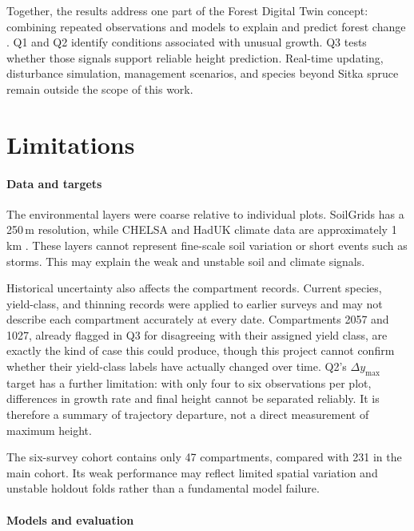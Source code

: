 \documentclass[logo,msc,ai]{infthesis}           %
\begin{document}
Together, the results address one part of the Forest Digital Twin concept: combining repeated observations and models to explain and predict forest change \cite{baskent2026Review_C1_SS,buonocore2022Proposal_C1_SS}. Q1 and Q2 identify conditions associated with unusual growth. Q3 tests whether those signals support reliable height prediction. Real-time updating, disturbance simulation, management scenarios, and species beyond Sitka spruce remain outside the scope of this work.

\section{Limitations}

\paragraph*{Data and targets}

The environmental layers were coarse relative to individual plots. SoilGrids has a 250\,m resolution, while CHELSA and HadUK climate data are approximately 1\,km \cite{poggio2021SoilGrids_C3_LID,karger2017CHELSA_C3_LID,hollis2019HadUKGrid_C3_LID}. These layers cannot represent fine-scale soil variation or short events such as storms. This may explain the weak and unstable soil and climate signals.

Historical uncertainty also affects the compartment records. Current species, yield-class, and thinning records were applied to earlier surveys and may not describe each compartment accurately at every date. Compartments 2057 and 1027, already flagged in Q3 for disagreeing with their assigned yield class, are exactly the kind of case this could produce, though this project cannot confirm whether their yield-class labels have actually changed over time. Q2's $\Delta y_{\max}$ target has a further limitation: with only four to six observations per plot, differences in growth rate and final height cannot be separated reliably. It is therefore a summary of trajectory departure, not a direct measurement of maximum height.

The six-survey cohort contains only 47 compartments, compared with 231 in the main cohort. Its weak performance may reflect limited spatial variation and unstable holdout folds rather than a fundamental model failure.

\paragraph*{Models and evaluation}
\end{document}
